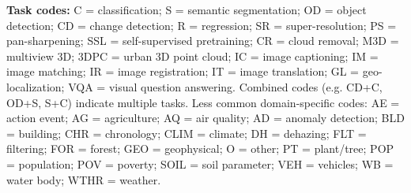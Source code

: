 \begin{center}
\begin{minipage}{0.98\textwidth}
\footnotesize
\textbf{Task codes:} C = classification; S = semantic segmentation; OD = object detection; CD = change detection; R = regression; SR = super-resolution; PS = pan-sharpening; SSL = self-supervised pretraining; CR = cloud removal; M3D = multiview 3D; 3DPC = urban 3D point cloud; IC = image captioning; IM = image matching; IR = image registration; IT = image translation; GL = geo-localization; VQA = visual question answering. Combined codes (e.g. CD+C, OD+S, S+C) indicate multiple tasks. Less common domain-specific codes: AE = action event; AG = agriculture; AQ = air quality; AD = anomaly detection; BLD = building; CHR = chronology; CLIM = climate; DH = dehazing; FLT = filtering; FOR = forest; GEO = geophysical; O = other; PT = plant/tree; POP = population; POV = poverty; SOIL = soil parameter; VEH = vehicles; WB = water body; WTHR = weather.
\end{minipage}
\end{center}
\normalsize